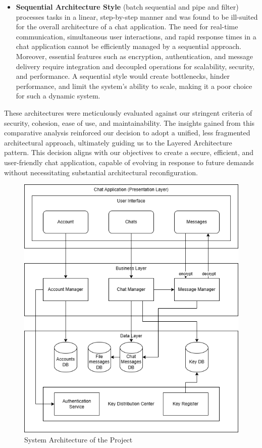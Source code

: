 \documentclass[]{article}
\begin{document}
\begin{itemize}
\begin{itemize}
		    \item \textbf{Sequential Architecture Style} (batch sequential and pipe and filter) processes tasks in a linear, step-by-step manner and was found to be ill-suited for the overall architecture of a chat application. The need for real-time communication, simultaneous user interactions, and rapid response times in a chat application cannot be efficiently managed by a sequential approach. Moreover, essential features such as encryption, authentication, and message delivery require integration and decoupled operations for scalability, security, and performance. A sequential style would create bottlenecks, hinder performance, and limit the system's ability to scale, making it a poor choice for such a dynamic system.
		\end{itemize}
	    These architectures were meticulously evaluated against our stringent criteria of security, cohesion, ease of use, and maintainability. The insights gained from this comparative analysis reinforced our decision to adopt a unified, less fragmented architectural approach, ultimately guiding us to the Layered Architecture pattern. This decision aligns with our objectives to create a secure, efficient, and user-friendly chat application, capable of evolving in response to future demands without necessitating substantial architectural reconfiguration.
\end{itemize}

\begin{figure}[H]
	\centering
	\includegraphics[width=1\textwidth]{architecture_diagram.drawio.png}
	\caption{System Architecture of the Project}
\end{figure}
\end{document}
